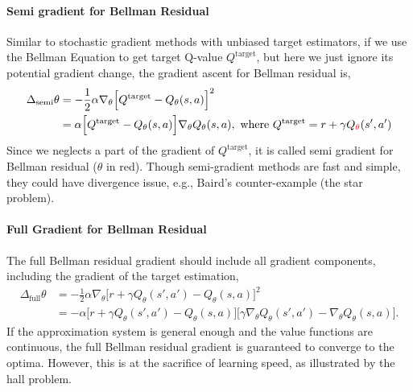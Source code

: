 \documentclass{article} %
\newcommand{\red}[1]{\textcolor{red}{#1}}
\begin{document}
\paragraph{Semi gradient for Bellman Residual}

Similar to stochastic gradient methods with unbiased target estimators, if we use the Bellman Equation to get target Q-value $Q^\text{target}$, but here we just ignore its potential gradient change, the gradient ascent for Bellman residual is,
\begin{equation}
\begin{aligned}
    \Delta_\text{semi} \theta &= -\frac{1}{2}\alpha \nabla_\theta  \Big[Q^\text{target} - Q_\theta(s, a) \Big]^2 \\ 
    &= \alpha \Big[Q^\text{target} - Q_\theta(s, a) \Big] \nabla_\theta Q_\theta(s, a), \text{ where } Q^\text{target} = r + \gamma Q_{\red{\theta}}(s', a')\label{eq:semi-grad}
\end{aligned}
\end{equation}
Since we neglects a part of the gradient of $Q^\text{target}$, it is called semi gradient for Bellman residual ($\theta$ in red). Though semi-gradient methods are fast and simple, they could have divergence issue, e.g., Baird's counter-example (the star problem).

\paragraph{Full Gradient for Bellman Residual}

The full Bellman residual gradient should include all gradient components, including the gradient of the target estimation, 
\begin{equation}
\begin{aligned}
    \Delta_\text{full} \theta &= -\frac{1}{2}\alpha \nabla_\theta  \Big[ r + \gamma Q_\theta(s', a') - Q_\theta(s, a) \Big]^2 \\
    & = -\alpha \Big[ r + \gamma Q_\theta(s', a') - Q_\theta(s, a) \Big] \Big[ \gamma\nabla_\theta Q_\theta(s', a') - \nabla_\theta Q_\theta(s, a) \Big].
\end{aligned}
\end{equation}
If the approximation system is general enough and the value functions are continuous, the full Bellman residual gradient is guaranteed to converge to the optima. However, this is at the sacrifice of learning speed, as illustrated by the hall problem.
\end{document}
